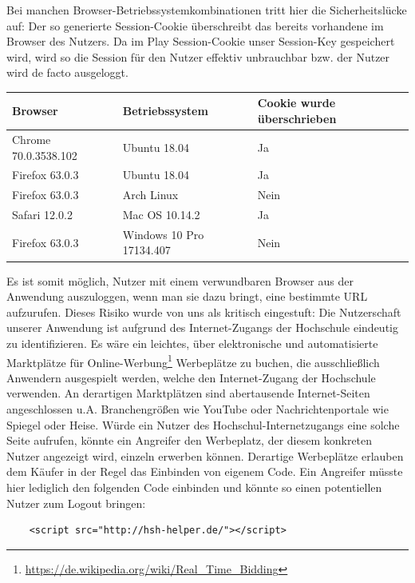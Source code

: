 \documentclass[12pt,DIV14,BCOR10mm,a4paper,parskip=half-,headsepline,headinclude,english,ngerman,bibliography=totocnumbered]{scrreprt}
\begin{document}
Bei manchen Browser-Betriebssystemkombinationen tritt hier die Sicherheitslücke auf: Der so generierte Session-Cookie überschreibt das bereits vorhandene im Browser des Nutzers. Da im Play Session-Cookie unser Session-Key gespeichert wird, wird so die Session für den Nutzer effektiv unbrauchbar bzw. der Nutzer wird de facto ausgeloggt.

\begin{center}
    \begin{tabular}{ | l | l | l | }
    \hline
    	Browser & Betriebssystem & Cookie wurde überschrieben \\ \hline
    	Chrome 70.0.3538.102 & Ubuntu 18.04 & Ja \\ \hline
    	Firefox 63.0.3 & Ubuntu 18.04 & Ja \\ \hline
    	Firefox 63.0.3 & Arch Linux & Nein \\ \hline
    	Safari 12.0.2 & Mac OS 10.14.2 & Ja \\ \hline
    	Firefox 63.0.3 & Windows 10 Pro 17134.407 & Nein \\ \hline
    \end{tabular}
\end{center}

Es ist somit möglich, Nutzer mit einem verwundbaren Browser aus der Anwendung auszuloggen, wenn man sie dazu bringt, eine bestimmte URL aufzurufen. Dieses Risiko wurde von uns als kritisch eingestuft: Die Nutzerschaft unserer Anwendung ist aufgrund des Internet-Zugangs der Hochschule eindeutig zu identifizieren. Es wäre ein leichtes, über elektronische und automatisierte Marktplätze für Online-Werbung\footnote{\url{https://de.wikipedia.org/wiki/Real_Time_Bidding}} Werbeplätze zu buchen, die ausschließlich Anwendern ausgespielt werden, welche den Internet-Zugang der Hochschule verwenden. An derartigen Marktplätzen sind abertausende Internet-Seiten angeschlossen u.A. Branchengrößen wie YouTube oder Nachrichtenportale wie Spiegel oder Heise. Würde ein Nutzer des Hochschul-Internetzugangs eine solche Seite aufrufen, könnte ein Angreifer den Werbeplatz, der diesem konkreten Nutzer angezeigt wird, einzeln erwerben können. Derartige Werbeplätze erlauben dem Käufer in der Regel das Einbinden von eigenem Code. Ein Angreifer müsste hier lediglich den folgenden Code einbinden und könnte so einen potentiellen Nutzer zum Logout bringen:

\begin{lstlisting}
	<script src="http://hsh-helper.de/"></script>
\end{lstlisting}
\end{document}
